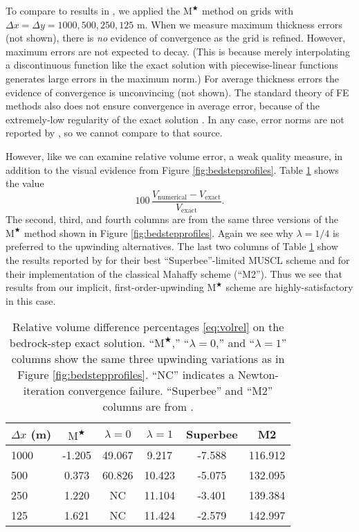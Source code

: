 \documentclass[twocolumn,letterpaper]{igs}
\newcommand{\Mstar}{$\text{M}^{\bigstar}$\xspace}
\begin{document}
To compare to results in \citep{JaroschSchoofAnslow2013}, we applied the \Mstar method on grids with $\Delta x=\Delta y = 1000,500,250,125$ m.  When we measure maximum thickness errors (not shown), there is \emph{no} evidence of convergence as the grid is refined.  However, maximum errors are not expected to decay.  (This is because merely interpolating a discontinuous function like the exact solution with piecewise-linear functions generates large errors in the maximum norm.)  For average thickness errors the evidence of convergence is unconvincing (not shown).  The standard theory of FE methods also does not ensure convergence in average error, because of the extremely-low regularity of the exact solution \citep{Elmanetal2005}.  In any case, error norms are not reported by \cite{JaroschSchoofAnslow2013}, so we cannot compare to that source.

However, like \cite{JaroschSchoofAnslow2013} we can examine relative volume error, a weak quality measure, in addition to the visual evidence from Figure \ref{fig:bedstepprofiles}.  Table \ref{tab:bedstepvol} shows the value
\begin{equation}
100\, \frac{V_{\text{numerical}} - V_{\text{exact}}}{V_{\text{exact}}}. \label{eq:volrel}
\end{equation}
The second, third, and fourth columns are from the same three versions of the \Mstar method shown in Figure \ref{fig:bedstepprofiles}.  Again we see why $\lambda=1/4$ is preferred to the upwinding alternatives.  The last two columns of Table \ref{tab:bedstepvol} show the results reported by \cite{JaroschSchoofAnslow2013} for their best ``Superbee''-limited MUSCL scheme and for their implementation of the classical Mahaffy scheme (``M2'').  Thus we see that results from our implicit, first-order-upwinding \Mstar scheme are highly-satisfactory in this case.

\begin{table}[ht]
  \caption{Relative volume difference percentages \eqref{eq:volrel} on the bedrock-step exact solution.  ``\Mstar,'' ``$\lambda=0$,'' and ``$\lambda=1$'' columns show the same three upwinding variations as in Figure \ref{fig:bedstepprofiles}.  ``NC'' indicates a Newton-iteration convergence failure.  ``Superbee'' and ``M2'' columns are from \cite{JaroschSchoofAnslow2013}.}
  \vskip4mm \centering
  \begin{tabular}{lccccc}
    $\Delta x$ (m) & \Mstar & $\lambda=0$ & $\lambda=1$ & Superbee & M2 \\  \hline
%
1000 &  -1.205 &  49.067 &   9.217 &  -7.588 & 116.912 \\
 500 &   0.373 &  60.826 &  10.423 &  -5.075 & 132.095 \\
 250 &   1.220 &  NC &  11.104 &  -3.401 & 139.384 \\
 125 &   1.621 &  NC &  11.424 &  -2.579 & 142.997 \\
  \end{tabular}
  \label{tab:bedstepvol}
\end{table}
\end{document}

